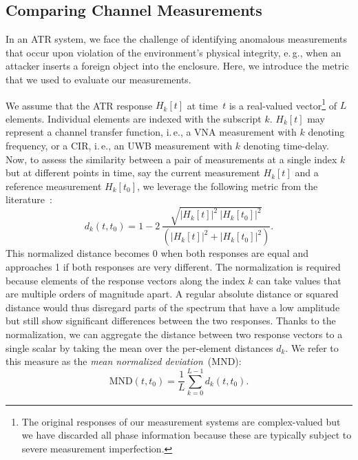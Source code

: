 \documentclass[conference]{IEEEtran}
\makeatletter
\newcommand{\ie}{i.\@\,e.\@\xspace}
\newcommand{\eg}{e.\@\,g.\@\xspace}
\makeatother
\begin{document}
\subsection{Comparing Channel Measurements}
In an ATR system, we face the challenge of identifying anomalous measurements that occur upon violation of the environment's physical integrity, \eg, when an attacker inserts a foreign object into the enclosure. Here, we introduce the metric that we used to evaluate our measurements.

We assume that the ATR response $H_k[t]$ at time~$t$ is a real-valued vector\footnote{The original responses of our measurement systems are complex-valued but we have discarded all phase information because these are typically subject to severe measurement imperfection.} of $L$ elements. Individual elements are indexed with the subscript $k$. $H_k[t]$ may represent a channel transfer function, \ie, a VNA measurement with $k$ denoting frequency, or a CIR, \ie, an UWB measurement with $k$ denoting time-delay. Now, to assess the similarity between a pair of measurements at a single index $k$ but at different points in time, say the current measurement $H_{k}[t]$ and a reference measurement $H_{k}[t_0]$, we leverage the following metric from the literature~\cite{doerryMeasuringChannelBalance2018}:
\begin{equation}
    d_k(t, t_0) = 1 - 2\,\frac{\sqrt{|H_k[t]|^2 \ |H_k[t_0]|^2}}{\left( |H_k[t]|^2 + |H_k[t_0]|^2 \right)}.\label{eq:channel_distance}
\end{equation}
This normalized distance becomes 0 when both responses are equal and approaches 1 if both responses are very different. The normalization is required because elements of the response vectors along the index $k$ can take values that are multiple orders of magnitude apart. A regular absolute distance or squared distance would thus disregard parts of the spectrum that have a low amplitude but still show significant differences between the two responses. Thanks to the normalization, we can aggregate the distance between two response vectors to a single scalar by taking the mean over the per-element distances $d_k$. We refer to this measure as the \textit{mean normalized deviation}~(MND):
\begin{equation}
    \textrm{MND}(t, t_0) = \frac{1}{L} \sum^{L-1}_{k=0} d_k(t, t_0). \label{eq:average_distance}
\end{equation}



 
\end{document}
